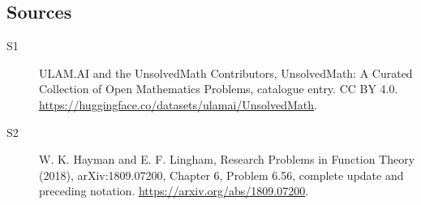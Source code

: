 \documentclass[11pt]{article}
\begin{document}
\subsection{Sources}
\begin{description}
\item[\hypertarget{source:statement:1}{S1}] ULAM.AI and the UnsolvedMath Contributors, UnsolvedMath: A Curated Collection of Open Mathematics Problems, catalogue entry. CC BY 4.0. \url{https://huggingface.co/datasets/ulamai/UnsolvedMath}.
\item[\hypertarget{source:statement:2}{S2}] W. K. Hayman and E. F. Lingham, Research Problems in Function Theory (2018), arXiv:1809.07200, Chapter 6, Problem 6.56, complete update and preceding notation. \url{https://arxiv.org/abs/1809.07200}.
\end{description}
\label{end:statement}
\end{document}
